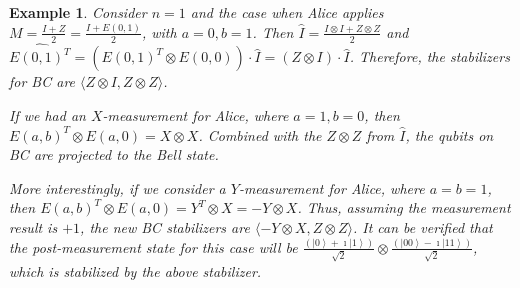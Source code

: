 \documentclass[journal,onecolumn]{IEEEtran}
\newtheorem{example}{Example}
\newcommand{\ghzmap}[1]{\widehat{#1}}
\newcommand{\dket}[1]{\left\lvert #1 \right\rangle}
\begin{document}
\begin{example}
\normalfont
Consider $n=1$ and the case when Alice applies $M = \frac{I+Z}{2} = \frac{I+E(0,1)}{2}$, with $a = 0, b = 1$.
Then $\ghzmap{I} = \frac{I \otimes I + Z \otimes Z}{2}$ and $\ghzmap{E(0,1)^T} = (E(0,1)^T \otimes E(0,0)) \cdot \ghzmap{I} = (Z \otimes I) \cdot \ghzmap{I}$.
Therefore, the stabilizers for BC are $\langle Z \otimes I, Z \otimes Z \rangle$.

If we had an $X$-measurement for Alice, where $a=1, b=0$, then $E(a,b)^T \otimes E(a,0) = X \otimes X$.
Combined with the $Z \otimes Z$ from $\ghzmap{I}$, the qubits on BC are projected to the Bell state.

More interestingly, if we consider a $Y$-measurement for Alice, where $a=b=1$, then $E(a,b)^T \otimes E(a,0) = Y^T \otimes X = - Y \otimes X$.
Thus, assuming the measurement result is $+1$, the new BC stabilizers  are $\langle - Y \otimes X, Z \otimes Z \rangle$.
It can be verified that the post-measurement state for this case will be $\frac{(\dket{0} + \imath \dket{1})}{\sqrt{2}} \otimes \frac{(\dket{00} - \imath \dket{11})}{\sqrt{2}}$, which is stabilized by the above stabilizer. \hfill \IEEEQEDhere
\end{example}
\end{document}
